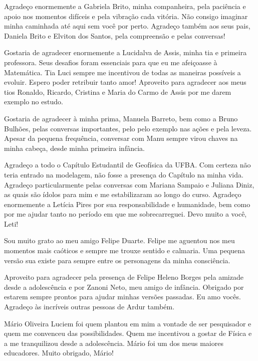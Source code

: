   Agradeço enormemente a Gabriela Brito, minha companheira, pela paciência e apoio nos momentos difíceis e pela vibração cada vitória. Não consigo imaginar minha caminhada até aqui sem você por perto. Agradeço também aos seus pais, Daniela Brito e Elviton dos Santos, pela compreensão e pelas conversas!

  Gostaria de agradecer enormemente a Lucidalva de Assis, minha tia e primeira professora. Seus desafios foram essenciais para que eu me afeiçoasse à Matemática. Tia Luci sempre me incentivou de todas as maneiras possíveis a evoluir. Espero poder retribuir tanto amor! Aproveito para agradecer aos meus tios Ronaldo, Ricardo, Cristina e Maria do Carmo de Assis por me darem exemplo no estudo.

  Gostaria de agradecer à minha prima, Manuela Barreto, bem como a Bruno Bulhões, pelas conversas importantes, pelo pelo exemplo nas ações e pela leveza. Apesar da pequena frequência, conversar com Manu sempre virou chaves na minha cabeça, desde minha primeira infância.

  Agradeço a todo o Capítulo Estudantil de Geofísica da UFBA. Com certeza não teria entrado na modelagem, não fosse a presença do Capítulo na minha vida. Agradeço particularmente pelas conversas com Mariana Sampaio e Juliana Diniz, as quais são ídolos para mim e me estabilizaram ao longo do curso. Agradeço enormemente a Letícia Pires por sua responsabilidade e humanidade, bem como por me ajudar tanto no período em que me sobrecarreguei. Devo muito a você, Leti!

  Sou muito grato ao meu amigo Felipe Duarte. Felipe me aguentou nos meu momentos mais caóticos e sempre me trouxe sentido e calmaria. \DIFaddbegin {}\DIFaddend Uma pequena versão sua existe para sempre entre os personagens da minha consciência\DIFdelbegin {}\DIFdelend .

  Aproveito para agradecer pela presença de Felipe Heleno Borges pela amizade desde a adolescência e por Zanoni Neto, meu amigo de infância. Obrigado por estarem sempre prontos para ajudar minhas versões passadas. Eu amo vocês. Agradeço às incríveis outras pessoas de Ardur também.

  Mário Oliveira Luciem foi quem plantou em mim a vontade de ser pesquisador e quem me convenceu das possibilidades. Quem me incentivou a gostar de Física e a me tranquilizou desde a adolescência. Mário foi um dos meus maiores educadores. Muito obrigado, Mário!

